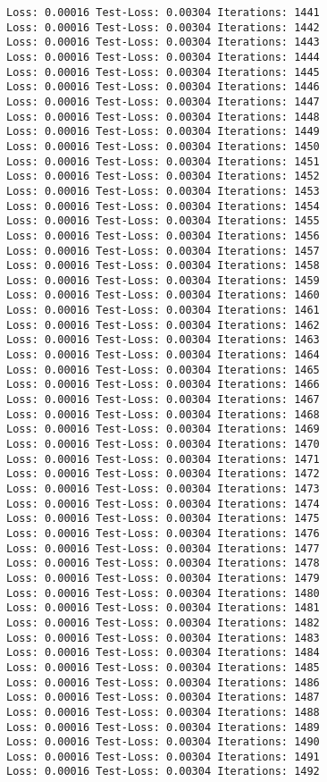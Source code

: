 \documentclass[11pt]{article}
\begin{document}
\begin{Verbatim}[commandchars=\\\{\}]
Loss: 0.00016 Test-Loss: 0.00304 Iterations: 1441
Loss: 0.00016 Test-Loss: 0.00304 Iterations: 1442
Loss: 0.00016 Test-Loss: 0.00304 Iterations: 1443
Loss: 0.00016 Test-Loss: 0.00304 Iterations: 1444
Loss: 0.00016 Test-Loss: 0.00304 Iterations: 1445
Loss: 0.00016 Test-Loss: 0.00304 Iterations: 1446
Loss: 0.00016 Test-Loss: 0.00304 Iterations: 1447
Loss: 0.00016 Test-Loss: 0.00304 Iterations: 1448
Loss: 0.00016 Test-Loss: 0.00304 Iterations: 1449
Loss: 0.00016 Test-Loss: 0.00304 Iterations: 1450
Loss: 0.00016 Test-Loss: 0.00304 Iterations: 1451
Loss: 0.00016 Test-Loss: 0.00304 Iterations: 1452
Loss: 0.00016 Test-Loss: 0.00304 Iterations: 1453
Loss: 0.00016 Test-Loss: 0.00304 Iterations: 1454
Loss: 0.00016 Test-Loss: 0.00304 Iterations: 1455
Loss: 0.00016 Test-Loss: 0.00304 Iterations: 1456
Loss: 0.00016 Test-Loss: 0.00304 Iterations: 1457
Loss: 0.00016 Test-Loss: 0.00304 Iterations: 1458
Loss: 0.00016 Test-Loss: 0.00304 Iterations: 1459
Loss: 0.00016 Test-Loss: 0.00304 Iterations: 1460
Loss: 0.00016 Test-Loss: 0.00304 Iterations: 1461
Loss: 0.00016 Test-Loss: 0.00304 Iterations: 1462
Loss: 0.00016 Test-Loss: 0.00304 Iterations: 1463
Loss: 0.00016 Test-Loss: 0.00304 Iterations: 1464
Loss: 0.00016 Test-Loss: 0.00304 Iterations: 1465
Loss: 0.00016 Test-Loss: 0.00304 Iterations: 1466
Loss: 0.00016 Test-Loss: 0.00304 Iterations: 1467
Loss: 0.00016 Test-Loss: 0.00304 Iterations: 1468
Loss: 0.00016 Test-Loss: 0.00304 Iterations: 1469
Loss: 0.00016 Test-Loss: 0.00304 Iterations: 1470
Loss: 0.00016 Test-Loss: 0.00304 Iterations: 1471
Loss: 0.00016 Test-Loss: 0.00304 Iterations: 1472
Loss: 0.00016 Test-Loss: 0.00304 Iterations: 1473
Loss: 0.00016 Test-Loss: 0.00304 Iterations: 1474
Loss: 0.00016 Test-Loss: 0.00304 Iterations: 1475
Loss: 0.00016 Test-Loss: 0.00304 Iterations: 1476
Loss: 0.00016 Test-Loss: 0.00304 Iterations: 1477
Loss: 0.00016 Test-Loss: 0.00304 Iterations: 1478
Loss: 0.00016 Test-Loss: 0.00304 Iterations: 1479
Loss: 0.00016 Test-Loss: 0.00304 Iterations: 1480
Loss: 0.00016 Test-Loss: 0.00304 Iterations: 1481
Loss: 0.00016 Test-Loss: 0.00304 Iterations: 1482
Loss: 0.00016 Test-Loss: 0.00304 Iterations: 1483
Loss: 0.00016 Test-Loss: 0.00304 Iterations: 1484
Loss: 0.00016 Test-Loss: 0.00304 Iterations: 1485
Loss: 0.00016 Test-Loss: 0.00304 Iterations: 1486
Loss: 0.00016 Test-Loss: 0.00304 Iterations: 1487
Loss: 0.00016 Test-Loss: 0.00304 Iterations: 1488
Loss: 0.00016 Test-Loss: 0.00304 Iterations: 1489
Loss: 0.00016 Test-Loss: 0.00304 Iterations: 1490
Loss: 0.00016 Test-Loss: 0.00304 Iterations: 1491
Loss: 0.00016 Test-Loss: 0.00304 Iterations: 1492

\end{Verbatim}
\end{document}
